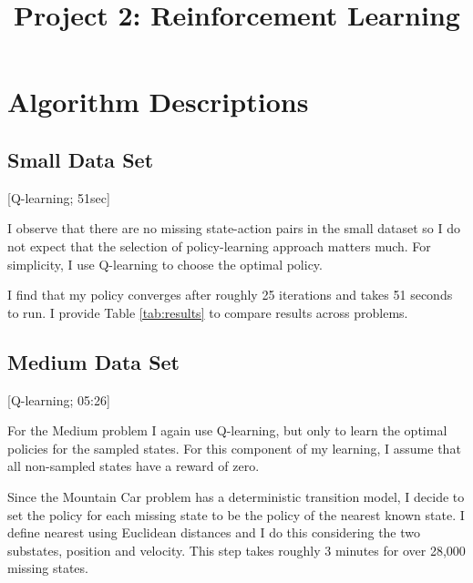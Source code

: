 \documentclass[twoside,11pt]{article}
\begin{document}
\title{Project 2: Reinforcement Learning}



\maketitle


\section{Algorithm Descriptions}
\subsection{Small Data Set}
[Q-learning; 51sec]

I observe that there are no missing state-action pairs in the small dataset so I do not expect that the selection of policy-learning approach matters much. For simplicity, I use Q-learning to choose the optimal policy.

I find that my policy converges after roughly 25 iterations and takes 51 seconds to run. I provide Table \ref{tab:results} to compare results across problems.

\subsection{Medium Data Set}
[Q-learning; 05:26]

For the Medium problem I again use Q-learning, but only to learn the optimal policies for the sampled states. For this component of my learning, I assume that all non-sampled states have a reward of zero. 

Since the Mountain Car problem has a deterministic transition model, I decide to set the policy for each missing state to be the policy of the nearest known state. I define nearest using Euclidean distances and I do this considering the two substates, position and velocity. This step takes roughly 3 minutes for over 28,000 missing states.
\end{document}
